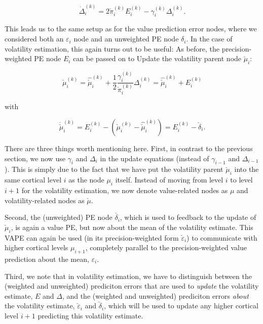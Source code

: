 \begin{equation}
	\dot{\Delta}_i^{(k)} = 2 \check{\pi}_i^{(k)} E_i^{(k)} - \gamma_i^{(k)} \Delta_i^{(k)}.
\end{equation}

This leads us to the same setup as for the value prediction error nodes, where we considered both an $\varepsilon_i$ node and an unweighted PE node $\delta_i$. In the case of volatility estimation, this again turns out to be useful: As before, the precision-weighted PE node $E_i$ can be passed on to \textsf{Update} the volatility parent node $\check{\mu}_i$:

\begin{equation}
	\check{\mu}_i^{(k)} = \hat{\check{\mu}}_i^{(k)} + \frac{1}{2} \frac{\gamma_i^{(k)}}{\check{\pi}_i^{(k)}} \Delta_i^{(k)} = \hat{\check{\mu}}_i^{(k)} + E_i^{(k)}
\end{equation}

with 

\begin{equation}
	\dot{\check{\mu}}_i^{(k)} = E_i^{(k)} - (\check{\mu}_i^{(k)} - \hat{\check{\mu}}_i^{(k)}) = E_i^{(k)} - \check{\delta}_i.
\end{equation}

There are three things worth mentioning here. First, in contrast to the previous section, we now use $\gamma_i$ and $\Delta_i$ in the update equations (instead of $\gamma_{i-1}$ and $\Delta_{i-1}$). This is simply due to the fact that we have put the volatility parent $\check{\mu}_i$ into the same cortical level $i$ as the node $\mu_i$ itself. Instead of moving from level $i$ to level $i+1$ for the volatility estimation, we now denote value-related nodes as $\mu$ and volatility-related nodes as $\check{\mu}$.

Second, the (unweighted) PE node $\check{\delta_i}$, which is used to feedback to the update of $\check{\mu}_i$, is again a value PE, but now about the mean of the volatility estimate. This \textsf{VAPE} can again be used (in its precision-weighted form $\check{\varepsilon}_i$) to communicate with higher cortical levels $\mu_{i+1}$, completely parallel to the precision-weighted value prediction about the mean, $\varepsilon_i$.

Third, we note that in volatility estimation, we have to distinguish between the (weighted and unweighted) prediciton errors that are used to \textit{update} the volatility estimate, $E$ and $\Delta$, and the (weighted and unweighted) prediciton errors \textit{about} the volatility estimate, $\check{\varepsilon}_i$ and $\check{\delta}_i$, which will be used to update any higher cortical level $i+1$ predicting this volatility estimate. 

